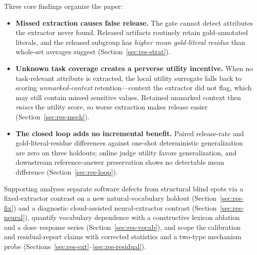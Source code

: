 \documentclass[11pt,a4paper]{article}
\begin{document}
Three core findings organize the paper:
\begin{itemize}
\item \textbf{Missed extraction causes false release.} The gate cannot detect attributes the extractor never found. Released artifacts routinely retain gold-annotated literals, and the released subgroup has \emph{higher mean gold-literal residue} than whole-set averages suggest (Section~\ref{sec:res-strat}).
\item \textbf{Unknown task coverage creates a perverse utility incentive.} When no task-relevant attribute is extracted, the local utility surrogate falls back to scoring \emph{unmarked-context} retention---context the extractor did not flag, which may still contain missed sensitive values. Retained unmarked context then \emph{raises} the utility score, so worse extraction makes release easier (Section~\ref{sec:res-mech}).
\item \textbf{The closed loop adds no incremental benefit.} Paired release-rate and gold-literal-residue differences against one-shot deterministic generalization are zero on three holdouts; online judge utility favors generalization, and downstream reference-answer preservation shows no detectable mean difference (Section~\ref{sec:res-loop}).
\end{itemize}
Supporting analyses separate software defects from structural blind spots via a fixed-extractor contrast on a new natural-vocabulary holdout (Section~\ref{sec:res-fix}) and a diagnostic cloud-assisted neural-extractor contrast (Section~\ref{sec:res-neural}), quantify vocabulary dependence with a constructive lexicon ablation and a dose--response series (Section~\ref{sec:res-vocab}), and scope the calibration and residual-report claims with corrected statistics and a two-type mechanism probe (Sections~\ref{sec:res-ext}--\ref{sec:res-residual}).
\end{document}
